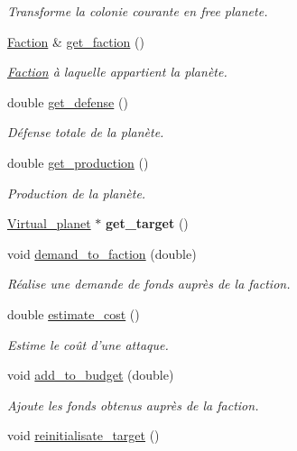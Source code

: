 \begin{DoxyCompactItemize}
\begin{DoxyCompactList}\small\item\em Transforme la colonie courante en free planete. \end{DoxyCompactList}\item 
\hyperlink{classFaction}{Faction} \& \hyperlink{classColonized__planet_a78748eadea1186e104ccc247a1d1f546}{get\-\_\-faction} ()
\begin{DoxyCompactList}\small\item\em \hyperlink{classFaction}{Faction} à laquelle appartient la planète. \end{DoxyCompactList}\item 
double \hyperlink{classColonized__planet_a587ca19477274169b045a94c1dd186a3}{get\-\_\-defense} ()
\begin{DoxyCompactList}\small\item\em Défense totale de la planète. \end{DoxyCompactList}\item 
double \hyperlink{classColonized__planet_a167b41cbb51c1d19d40cb3707af2ea59}{get\-\_\-production} ()
\begin{DoxyCompactList}\small\item\em Production de la planète. \end{DoxyCompactList}\item 
\hypertarget{classColonized__planet_a6739ad553640a6b5a02dfd9d97e7ba2d}{\hyperlink{classVirtual__planet}{Virtual\-\_\-planet} $\ast$ {\bfseries get\-\_\-target} ()}\label{classColonized__planet_a6739ad553640a6b5a02dfd9d97e7ba2d}

\item 
void \hyperlink{classColonized__planet_a0b5f60dc9483575db786313282e29886}{demand\-\_\-to\-\_\-faction} (double)
\begin{DoxyCompactList}\small\item\em Réalise une demande de fonds auprès de la faction. \end{DoxyCompactList}\item 
double \hyperlink{classColonized__planet_aa6f348f353079fb347dc8ac09d8b1067}{estimate\-\_\-cost} ()
\begin{DoxyCompactList}\small\item\em Estime le coût d'une attaque. \end{DoxyCompactList}\item 
void \hyperlink{classColonized__planet_a35968145bd39bba554c026e499976e44}{add\-\_\-to\-\_\-budget} (double)
\begin{DoxyCompactList}\small\item\em Ajoute les fonds obtenus auprès de la faction. \end{DoxyCompactList}\item 
\hypertarget{classColonized__planet_a61098b25c33cbf5bf36e3629a42f7ee7}{void \hyperlink{classColonized__planet_a61098b25c33cbf5bf36e3629a42f7ee7}{reinitialisate\-\_\-target} ()}\label{classColonized__planet_a61098b25c33cbf5bf36e3629a42f7ee7}


\end{DoxyCompactItemize}
